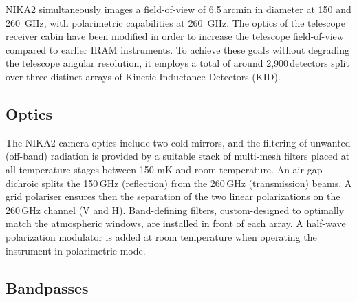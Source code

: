 
NIKA2 simultaneously images a field-of-view of
6.5\,arcmin in diameter at 150 and 260~GHz, with polarimetric capabilities at
260~GHz. The optics of the telescope receiver cabin have been modified in order
to increase the telescope field-of-view compared to earlier IRAM instruments. To
achieve these goals without degrading the telescope angular resolution, it
employs a total of around 2,900\,detectors split over three distinct arrays of
Kinetic Inductance Detectors (KID).

\subsection{Optics}

The NIKA2 camera optics include two cold mirrors, and the filtering of unwanted
(off-band) radiation is provided by a suitable stack of multi-mesh filters
placed at all temperature stages between 150 mK and room temperature. An air-gap
dichroic splits the 150\,GHz (reflection) from the 260\,GHz (transmission)
beams. A grid polariser ensures then the separation of the two linear
polarizations on the 260\,GHz channel (V and H). Band-defining filters,
custom-designed to optimally match the atmospheric windows, are installed in
front of each array. A half-wave polarization modulator is added at room
temperature when operating the instrument in polarimetric mode.

\subsection{Bandpasses}

